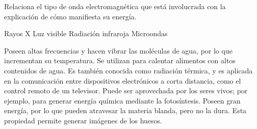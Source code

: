 Relaciona el tipo de onda electromagnética  que está involucrada con la  explicación de cómo manifiesta su energía.

\begin{minipage}{0.3\textwidth}
    \begin{choices}
        \choice Rayos X
        \choice Luz visible
        \choice Radiación infraroja
        \choice Microondas
    \end{choices}
\end{minipage}\hfill
\begin{minipage}{0.7\textwidth}
    \begin{parts}
        \fillin[D][1cm] Poseen altas frecuencias y hacen vibrar las moléculas de agua, por lo que incrementan su temperatura. Se utilizan para calentar alimentos con altos contenidos de agua.
        \fillin[C][1cm] Es también conocida como radiación térmica, y es aplicada en la comunicación entre dispositivos electrónicos a corta distancia, como el control remoto de un televisor.
        \fillin[B][1cm] Puede ser aprovechada por los seres vivos; por ejemplo, para generar energía química mediante la fotosíntesis.
        \fillin[A][1cm] Poseen gran energía, por lo que pueden atravesar la materia blanda, pero no la dura. Esta propiedad permite generar imágenes de los huesos.
    \end{parts}
\end{minipage}%